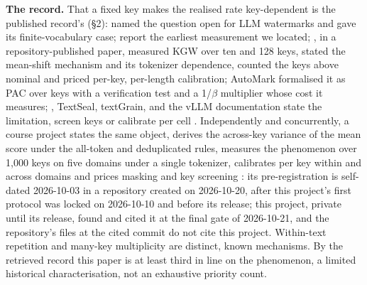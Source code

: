 \documentclass[11pt,letterpaper]{article}
\begin{document}
\textbf{The record.} That a fixed key makes the realised rate key-dependent is the published record's (\S{}2): \citet{jovanovic2025image} named the question open for LLM watermarks and gave its finite-vocabulary case; \citet{gloaguen2026diffusion} report the earliest measurement we located; \citet{genhatharan2026nominal}, in a repository-published paper, measured KGW over ten and 128 keys, stated the mean-shift mechanism and its tokenizer dependence, counted the keys above nominal and priced per-key, per-length calibration; AutoMark \citep{gloaguen2026automark} formalised it as PAC over keys with a verification test and a 1/\ensuremath{\beta} multiplier whose cost it measures; \citet{fernandez2026posthoc}, TextSeal, textGrain, \citet{delbianco2026compliance} and the vLLM documentation state the limitation, screen keys or calibrate per cell \citep{sander2026textseal, openai2026textgrain, vllm2026watermarking}. Independently and concurrently, a course project states the same object, derives the across-key variance of the mean score under the all-token and deduplicated rules, measures the phenomenon over 1,000 keys on five domains under a single tokenizer, calibrates per key within and across domains and prices masking and key screening \citep{yukhimchuk2026keylottery}: its pre-registration is self-dated 2026-10-03 in a repository created on 2026-10-20, after this project's first protocol was locked on 2026-10-10 and before its release; this project, private until its release, found and cited it at the final gate of 2026-10-21, and the repository's files at the cited commit do not cite this project. Within-text repetition \citep{fernandez2023bricks, kirchenbauer2024reliability, cai2025collision} and many-key multiplicity \citep{fu2025multiuse} are distinct, known mechanisms. By the retrieved record this paper is at least third in line on the phenomenon, a limited historical characterisation, not an exhaustive priority count.
\end{document}
